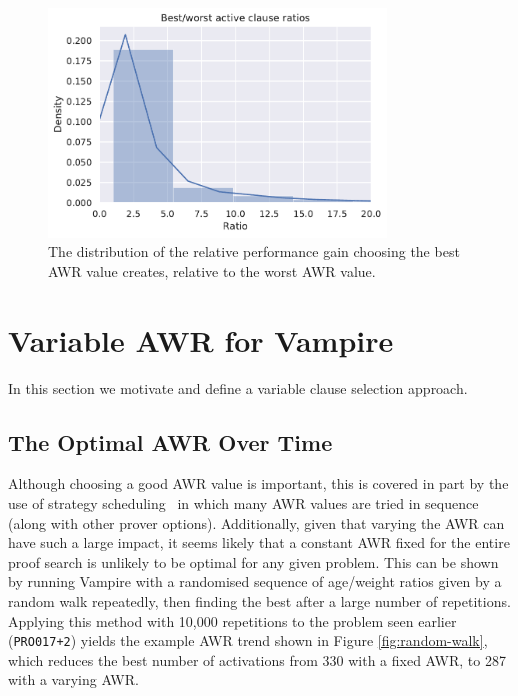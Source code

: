 \documentclass{llncs}
\begin{document}
\begin{figure}
	\centering
	\includegraphics[width=0.8\textwidth]{optimal-awr-improvement}
	\caption{The distribution of the relative performance gain choosing the best AWR value creates, relative to the worst AWR value.}
	\label{fig:optimal-awr-improvement}
\end{figure}




\section{Variable AWR for Vampire} 

In this section we motivate and define a variable clause selection approach.

\subsection{The Optimal AWR Over Time} \label{sec:varying:study}

Although choosing a good AWR value is important, this is covered in part by the use of strategy scheduling~\cite{CADE18} in which many AWR values are tried in sequence (along with other prover options).
Additionally, given that varying the AWR can have such a large impact, it seems likely that a constant AWR fixed for the entire proof search is unlikely to be optimal for any given problem.
This can be shown by running Vampire with a randomised sequence of age/weight ratios given by a random walk repeatedly, then finding the best after a large number of repetitions.
Applying this method with 10,000 repetitions to the problem seen earlier (\texttt{PRO017+2}) yields the example AWR trend shown in Figure \ref{fig:random-walk}, which reduces the best number of activations from 330 with a fixed AWR, to 287 with a varying AWR.
\end{document}
